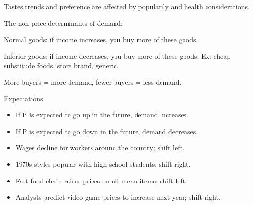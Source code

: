 \documentclass{scrreprt} %
\begin{document}
Tastes trends and preference are affected by popularily and health considerations.

The non-price determinants of demand:

\begin{definition}
	Normal goods: if income increases, you buy more of these goods.

	Inferior goods: if income decreases, you buy more of these goods. Ex: 
	cheap substitude foods, store brand, generic.
\end{definition}

More buyers = more demand, fewer buyers = less demand.

Expectations

\begin{itemize}
	\item If P is expected to go up in the future, demand increases.
	\item If P is expected to go down in the future, demand decreases.
\end{itemize}

\begin{example}
	\begin{itemize}
		\item Wages decline for workers around the country; shift left.
		\item 1970s styles popular with high school students; shift right.
		\item Fast food chain raises prices on all menu items; shift left.
		\item Analysts predict video game prices to increase next year; shift right.
	\end{itemize}


\end{example}
\end{document}
